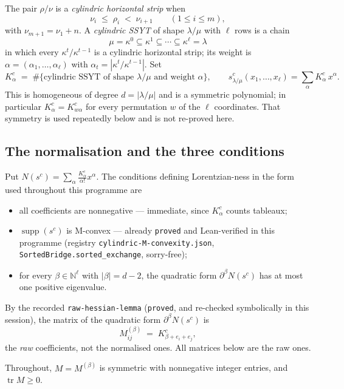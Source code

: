 \documentclass[11pt]{article}
\theoremstyle{plain}
\theoremstyle{definition}
\DeclareMathOperator{\tr}{tr}
\DeclareMathOperator{\supp}{supp}
\newcommand{\NN}{\mathbb{N}}
\begin{document}
The pair $\rho/\nu$ is a \emph{cylindric horizontal strip} when
\begin{equation}\label{eq:hstrip}
\nu_i\;\le\;\rho_i\;<\;\nu_{i+1}\qquad(1\le i\le m),
\end{equation}
with $\nu_{m+1}=\nu_1+n$. A \emph{cylindric SSYT} of shape $\lambda/\mu$ with $\ell$ rows is a
chain
\[
\mu=\kappa^0\subseteq\kappa^1\subseteq\cdots\subseteq\kappa^{\ell}=\lambda
\]
in which every $\kappa^{t}/\kappa^{t-1}$ is a cylindric horizontal strip; its weight is
$\alpha=(\alpha_1,\dots,\alpha_\ell)$ with $\alpha_t=|\kappa^t/\kappa^{t-1}|$. Set
\[
K^c_\alpha \;=\; \#\{\text{cylindric SSYT of shape }\lambda/\mu\text{ and weight }\alpha\},
\qquad
s^c_{\lambda/\mu}(x_1,\dots,x_\ell)=\sum_\alpha K^c_\alpha\,x^\alpha .
\]
This is homogeneous of degree $d=|\lambda/\mu|$ and is a symmetric polynomial; in particular
$K^c_\alpha=K^c_{w\alpha}$ for every permutation $w$ of the $\ell$ coordinates. That symmetry is
used repeatedly below and is not re-proved here.

\subsection{The normalisation and the three conditions}

Put $N(s^c)=\sum_\alpha \frac{K^c_\alpha}{\alpha!}x^\alpha$. The conditions defining Lorentzian-ness
in the form used throughout this programme are
\begin{itemize}
\item[(L1)] all coefficients are nonnegative --- immediate, since $K^c_\alpha$ counts tableaux;
\item[(L2)] $\supp(s^c)$ is M-convex --- already \texttt{proved} and Lean-verified in this
programme (registry \texttt{cylindric-M-convexity.json}, \texttt{SortedBridge.sorted\_exchange},
sorry-free);
\item[(L3)] for every $\beta\in\NN^\ell$ with $|\beta|=d-2$, the quadratic form $\partial^\beta N(s^c)$
has at most one positive eigenvalue.
\end{itemize}
By the recorded \texttt{raw-hessian-lemma} (\texttt{proved}, and re-checked symbolically in this
session), the matrix of the quadratic form $\partial^\beta N(s^c)$ is
\begin{equation}\label{eq:rawhess}
M^{(\beta)}_{ij}\;=\;K^c_{\beta+e_i+e_j},
\end{equation}
the \emph{raw} coefficients, not the normalised ones. All matrices below are the raw ones.

Throughout, $M=M^{(\beta)}$ is symmetric with nonnegative integer entries, and $\tr M\ge0$.
\end{document}
